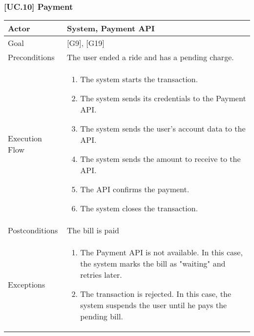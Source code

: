 \documentclass[english]{article}
\begin{document}
			\subsubsection{[UC.10] Payment}
			\begin{tabularx}{\textwidth}{  l  X  }
				\hline
				Actor & System, Payment API\\
				\hline
				Goal & [G9], [G19]\\
				\hline
				Preconditions & The user ended a ride and has a pending charge.\\
				\hline
				Execution Flow & \begin{enumerate}
					\item{The system starts the transaction.}
					\item{The system sends its credentials to the Payment API.}
					\item{The system sends the user's account data to the API.}
					\item{The system sends the amount to receive to the API.}
					\item{The API confirms the payment.}
					\item{The system closes the transaction.}
				\end{enumerate}\\
				\hline
				Postconditions & The bill is paid\\
				\hline
				Exceptions & \begin{enumerate}
					\item{The Payment API is not available. In this case, the system marks the bill as "waiting" and retries later.}
					\item{The transaction is rejected. In this case, the system suspends the user until he pays the pending bill.}
				\end{enumerate}\\
				\hline
			\end{tabularx}
			
\end{document}
